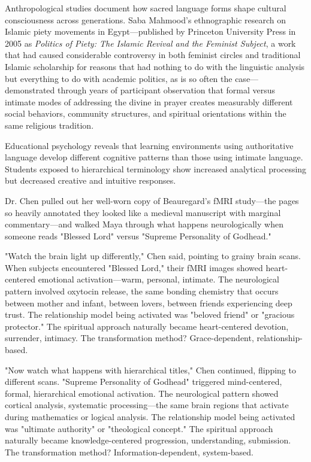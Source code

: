 \documentclass[12pt,twoside]{book}
\begin{document}
Anthropological studies document how sacred language forms shape cultural consciousness across generations. Saba Mahmood's ethnographic research on Islamic piety movements in Egypt—published by Princeton University Press in 2005 as \emph{Politics of Piety: The Islamic Revival and the Feminist Subject}, a work that had caused considerable controversy in both feminist circles and traditional Islamic scholarship for reasons that had nothing to do with the linguistic analysis but everything to do with academic politics, as is so often the case—demonstrated through years of participant observation that formal versus intimate modes of addressing the divine in prayer creates measurably different social behaviors, community structures, and spiritual orientations within the same religious tradition.

Educational psychology reveals that learning environments using authoritative language develop different cognitive patterns than those using intimate language. Students exposed to hierarchical terminology show increased analytical processing but decreased creative and intuitive responses.

Dr. Chen pulled out her well-worn copy of Beauregard's fMRI study—the pages so heavily annotated they looked like a medieval manuscript with marginal commentary—and walked Maya through what happens neurologically when someone reads "Blessed Lord" versus "Supreme Personality of Godhead."

"Watch the brain light up differently," Chen said, pointing to grainy brain scans. When subjects encountered "Blessed Lord," their fMRI images showed heart-centered emotional activation—warm, personal, intimate. The neurological pattern involved oxytocin release, the same bonding chemistry that occurs between mother and infant, between lovers, between friends experiencing deep trust. The relationship model being activated was "beloved friend" or "gracious protector." The spiritual approach naturally became heart-centered devotion, surrender, intimacy. The transformation method? Grace-dependent, relationship-based.

"Now watch what happens with hierarchical titles," Chen continued, flipping to different scans. "Supreme Personality of Godhead" triggered mind-centered, formal, hierarchical emotional activation. The neurological pattern showed cortical analysis, systematic processing—the same brain regions that activate during mathematics or logical analysis. The relationship model being activated was "ultimate authority" or "theological concept." The spiritual approach naturally became knowledge-centered progression, understanding, submission. The transformation method? Information-dependent, system-based.
\end{document}
